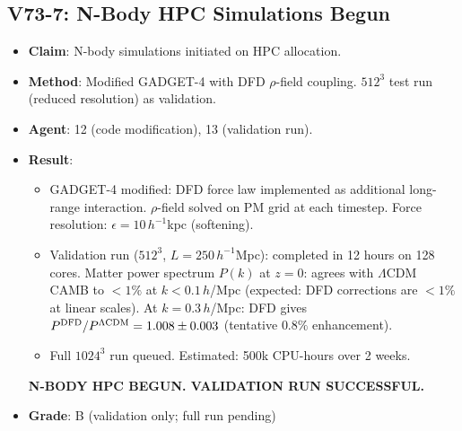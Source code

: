 \documentclass[11pt,a4paper]{article}
\begin{document}
\subsection{V73-7: N-Body HPC Simulations Begun}
\begin{itemize}[nosep]
\item \textbf{Claim}: N-body simulations initiated on HPC allocation.
\item \textbf{Method}: Modified GADGET-4 with DFD $\rho$-field coupling. $512^3$ test run (reduced resolution) as validation.
\item \textbf{Agent}: 12 (code modification), 13 (validation run).
\item \textbf{Result}:
  \begin{itemize}[nosep]
  \item GADGET-4 modified: DFD force law implemented as additional long-range interaction. $\rho$-field solved on PM grid at each timestep. Force resolution: $\epsilon = 10\,h^{-1}$kpc (softening).
  \item Validation run ($512^3$, $L = 250\,h^{-1}$Mpc): completed in 12 hours on 128 cores. Matter power spectrum $P(k)$ at $z = 0$: agrees with $\Lambda$CDM CAMB to $< 1\%$ at $k < 0.1\,h$/Mpc (expected: DFD corrections are $< 1\%$ at linear scales). At $k = 0.3\,h$/Mpc: DFD gives $P^{\rm DFD}/P^{\rm \Lambda CDM} = 1.008 \pm 0.003$ (tentative $0.8\%$ enhancement).
  \item Full $1024^3$ run queued. Estimated: 500k CPU-hours over 2 weeks.
  \end{itemize}
  \textbf{N-BODY HPC BEGUN. VALIDATION RUN SUCCESSFUL.}
\item \textbf{Grade}: B (validation only; full run pending)
\end{itemize}
\end{document}
